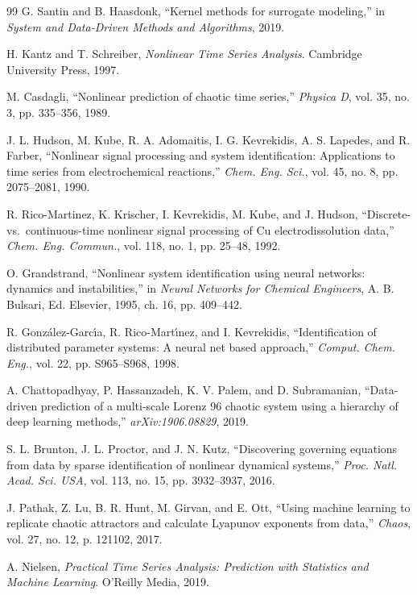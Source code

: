 \documentclass[11pt,a4paper]{article}
\begin{document}
\begin{thebibliography}{99}
G. Santin and B. Haasdonk, ``Kernel methods for surrogate modeling,'' in \textit{System and Data-Driven Methods and Algorithms}, 2019.

H. Kantz and T. Schreiber, \textit{Nonlinear Time Series Analysis}. Cambridge University Press, 1997.

M. Casdagli, ``Nonlinear prediction of chaotic time series,'' \textit{Physica D}, vol. 35, no. 3, pp. 335--356, 1989.

J. L. Hudson, M. Kube, R. A. Adomaitis, I. G. Kevrekidis, A. S. Lapedes, and R. Farber, ``Nonlinear signal processing and system identification: Applications to time series from electrochemical reactions,'' \textit{Chem. Eng. Sci.}, vol. 45, no. 8, pp. 2075--2081, 1990.

R. Rico-Martinez, K. Krischer, I. Kevrekidis, M. Kube, and J. Hudson, ``Discrete-vs.\ continuous-time nonlinear signal processing of Cu electrodissolution data,'' \textit{Chem. Eng. Commun.}, vol. 118, no. 1, pp. 25--48, 1992.

O. Grandstrand, ``Nonlinear system identification using neural networks: dynamics and instabilities,'' in \textit{Neural Networks for Chemical Engineers}, A. B. Bulsari, Ed. Elsevier, 1995, ch. 16, pp. 409--442.

R. Gonz\'{a}lez-Garc\'{\i}a, R. Rico-Mart\'{\i}nez, and I. Kevrekidis, ``Identification of distributed parameter systems: A neural net based approach,'' \textit{Comput. Chem. Eng.}, vol. 22, pp. S965--S968, 1998.

A. Chattopadhyay, P. Hassanzadeh, K. V. Palem, and D. Subramanian, ``Data-driven prediction of a multi-scale Lorenz 96 chaotic system using a hierarchy of deep learning methods,'' \textit{arXiv:1906.08829}, 2019.

S. L. Brunton, J. L. Proctor, and J. N. Kutz, ``Discovering governing equations from data by sparse identification of nonlinear dynamical systems,'' \textit{Proc. Natl. Acad. Sci. USA}, vol. 113, no. 15, pp. 3932--3937, 2016.

J. Pathak, Z. Lu, B. R. Hunt, M. Girvan, and E. Ott, ``Using machine learning to replicate chaotic attractors and calculate Lyapunov exponents from data,'' \textit{Chaos}, vol. 27, no. 12, p. 121102, 2017.

A. Nielsen, \textit{Practical Time Series Analysis: Prediction with Statistics and Machine Learning}. O'Reilly Media, 2019.


\end{thebibliography}
\end{document}
